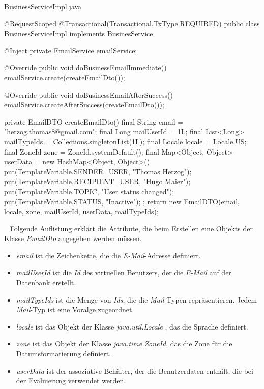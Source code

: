 \begin{program}[h]
\caption{BusinessServiceImpl.java}
\label{prog:businessServiceImpl}
\begin{JavaCode}
@RequestScoped
@Transactional(Transactional.TxType.REQUIRED)
public class BusinessServiceImpl implements BusinesService {

    @Inject
    private EmailService emailService;

    @Override
    public void doBusinessEmailImmediate() {
        emailService.create(createEmailDto());
    }

    @Override
    public void doBusinessEmailAfterSuccess() {
        emailService.createAfterSuccess(createEmailDto());
    }

    private EmailDTO createEmailDto() {
        final String email = "herzog.thomas8@gmail.com";
        final Long mailUserId = 1L;
        final List<Long> mailTypeIds = Collections.singletonList(1L);
        final Locale locale = Locale.US;
        final ZoneId zone = ZoneId.systemDefault();
        final Map<Object, Object> userData = 
        	new HashMap<Object, Object>() {{
                put(TemplateVariable.SENDER_USER, "Thomas Herzog");
                put(TemplateVariable.RECIPIENT_USER, "Hugo Maier");
                put(TemplateVariable.TOPIC, "User status changed");
                put(TemplateVariable.STATUS, "Inactive");
            }};
        return new EmailDTO(email, 
        					locale, 
        					zone, 
        					mailUserId, 
        					userData, 
        					mailTypeIds);
    }
}
\end{JavaCode}
\end{program}
\ \newline
Folgende Auflistung erklärt die Attribute, die beim Erstellen eine Objekts der Klasse \emph{EmailDto} angegeben werden müssen.
\begin{itemize}
	\item\emph{email} ist die Zeichenkette, die die \emph{E-Mail}-Adresse definiert.
	\item\emph{mailUserId} ist die \emph{Id} des virtuellen Benutzers, der die \emph{E-Mail} auf der Datenbank erstellt.
	\item\emph{mailTypeIds} ist die Menge von \emph{Ids}, die die \emph{Mail}-Typen repräsentieren. Jedem \emph{Mail}-Typ ist eine Voralge zugeordnet.
	\item\emph{locale} ist das Objekt der Klasse \emph{java.util.Locale} , das die Sprache definiert.
	\item\emph{zone} ist das Objekt der Klasse \emph{java.time.ZoneId}, das die Zone für die Datumsformatierung definiert.
	\item\emph{userData} ist der assoziative Behälter, der die Benutzerdaten enthält, die bei der Evaluierung verwendet werden.
\end{itemize}

